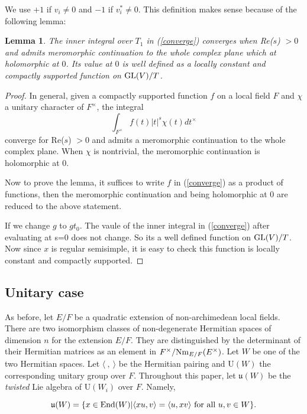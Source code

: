 \documentclass[11pt, oneside,reqno]{amsart}   	%
\newtheorem{lemma}[theorem]{Lemma}
\begin{document}
 We use $+1$ if $v_i \neq 0$ and $-1$ if $v_i^* \neq 0$. This definition makes sense because of the following lemma:

\begin{lemma}
The inner integral over $T_1$ in \textup{(\ref{converge})} converges when \textup{Re($s$)} $> 0$ and  admits meromorphic continuation to the whole complex plane which at holomorphic at $0$. Its value at $0$ is well defined as a locally constant and compactly supported function on $\textup{GL($V$)}/T$.
\end{lemma}
\begin{proof}
In general, given a compactly supported function $f$ on a local field $F$ and $\chi$ a unitary character of $F^\times$, the integral $$\int_{F^\times} f(t)|t|^s\chi(t)dt^\times$$
converge for Re($s$) $> 0$ and admits a meromorphic continuation to the whole complex plane. When $\chi$ is nontrivial, the meromorphic continuation is holomorphic at $0$.

Now to prove the lemma, it suffices to write $f$ in (\ref{converge}) as a product of functions, then the meromorphic continuation and being holomorphic at $0$ are reduced to the above statement.

If we change $g$ to $gt_0$. The vaule of the inner integral in (\ref{converge}) after evaluating at s=0 does not change. So its a well defined function on $\textup{GL$(V)$}/T$. Now since $x$ is regular semisimple, it is easy to check this function is locally constant and compactly supported. 

\end{proof}



\subsection{Unitary case} 

As before, let $E/F$ be a quadratic extension of non-archimedean local fields. There are two isomorphism classes of non-degenerate Hermitian spaces of dimension $n$ for the extension $E/F$. They are distinguished by the determinant of their Hermitian matrices as an element in $F^\times/\textup{Nm}_{E/F}(E^\times)$. Let $W$ be one of the two Hermitian spaces. Let $\langle \ , \ \rangle$ be the Hermitian pairing and U$(W)$ the corresponding unitary group over $F$. Throughout this paper, let $\mathfrak{u}(W)$ be the \textit{twisted} Lie algebra of U$(W_i)$ over $F$. Namely,

$$\mathfrak{u}(W)=\{x \in \textup{End}(W)|\langle xu , v\rangle=\langle u , xv\rangle \textup{ for all }u,v \in W \}.$$
\end{document}
